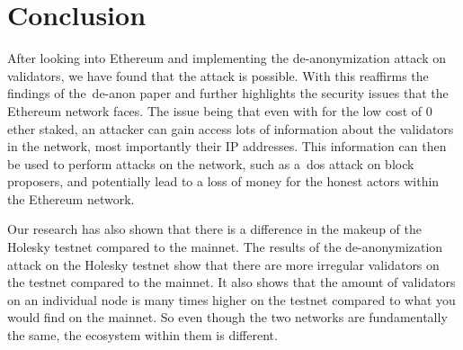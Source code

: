 

\section{Conclusion}\label{sec:conclusion}
After looking into Ethereum and implementing the de-anonymization attack on validators, we have found that the attack is possible.
With this reaffirms the findings of the~\gls{de-anon paper} and further highlights the security issues that the Ethereum network faces.
The issue being that even with for the low cost of 0 ether staked, an attacker can gain access lots of information about the validators in the network, most importantly their IP addresses.
This information can then be used to perform attacks on the network, such as a~\gls{dos} attack on block proposers, and potentially lead to a loss of money for the honest actors within the Ethereum network.


Our research has also shown that there is a difference in the makeup of the Holesky testnet compared to the mainnet.
The results of the de-anonymization attack on the Holesky testnet show that there are more irregular validators on the testnet compared to the mainnet.
It also shows that the amount of validators on an individual node is many times higher on the testnet compared to what you would find on the mainnet.
So even though the two networks are fundamentally the same, the ecosystem within them is different.